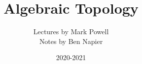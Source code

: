 


\title{Algebraic Topology}
\author{Lectures by Mark Powell \\ Notes by Ben Napier}
\date{2020-2021}



\maketitle
\tableofcontents



